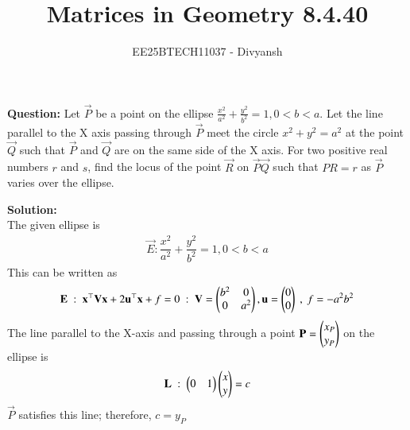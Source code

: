 \documentclass[journal,12pt,onecolumn]{IEEEtran}
\title{Matrices in Geometry 8.4.40}
\author{EE25BTECH11037 - Divyansh}
\theoremstyle{remark}
\begin{document}
\vspace{3cm}
\maketitle
{\let\newpage\relax\maketitle}
\textbf{Question: }
Let $\vec{P}$ be a point on the ellipse $\frac{x^2}{a^2} + \frac{y^2}{b^2}=1 , 0<b<a$. Let the line parallel to the X axis passing through $\vec{P}$ meet the circle $x^2 + y^2= a^2$ at the point $\vec{Q}$ such that $\vec{P}$ and $\vec{Q}$ are on the same side of the X axis. For two positive real numbers $r$ and $s$, find the locus of the point $\vec{R}$ on $\vec{P}\vec{Q}$ such that $PR = r$ as $\vec{P}$ varies over the ellipse.
\vspace{2mm}


\textbf{Solution:}
\\
The given ellipse is 
\begin{align}
    \vec{E} : \dfrac{x^2}{a^2} + \dfrac{y^2}{b^2} =1, 0<b<a
\end{align}
This can be written as
\begin{align}
    \mathbf{E} \ : \ \mathbf{x}^{\top}\mathbf{V}\mathbf{x} + 2 \mathbf{u}^{\top}\mathbf{x} + f=0 \ : \ \mathbf{V}=\begin{pmatrix}b^2 & 0 \\ 0 & a^2\end{pmatrix}, \mathbf{u}=\begin{pmatrix}0\\0\end{pmatrix}\ , \ f=-a^2b^2 
\end{align}
The line parallel to the X-axis and passing through a point $\mathbf{P}=\begin{pmatrix}x_P \\ y_P\end{pmatrix}$ on the ellipse is 
\begin{align}
    \mathbf{L}\ :\ \begin{pmatrix}0&1\end{pmatrix}\begin{pmatrix}x\\y\end{pmatrix}=c
\end{align}
$\vec{P}$ satisfies this line; therefore, $c=y_P$
\end{document}

